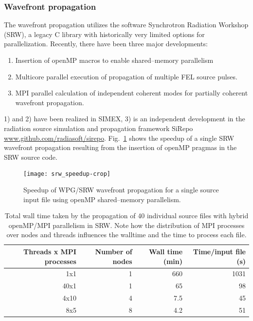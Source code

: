 \documentclass[10pt]{scrartcl}
\begin{document}
\subsubsection{Wavefront propagation}
The wavefront propagation utilizes the software Synchrotron Radiation Workshop
(SRW), a legacy C library with historically very limited options for
parallelization. Recently, there have been three major developments:
\begin{enumerate}
  \item Insertion of openMP macros to enable shared--memory parallelism
  \item Multicore parallel execution of propagation of multiple FEL source
    pulses.
  \item MPI parallel calculation of independent coherent modes for partially
    coherent wavefront propagation.
\end{enumerate}
%
1) and 2) have been realized in SIMEX, 3) is an independent development in the radiation source
simulation and propagation framework SiRepo
\url{www.github.com/radiasoft/sirepo}. Fig.~\ref{fig:srw_speedup} shows the
speedup of a single SRW wavefront propagation resulting from the insertion of
openMP pragmas in the SRW source code.
%
\begin{figure}[ht]
  \begin{center}
    \texttt{[image: srw\_speedup-crop]}
  \end{center}
  \caption{Speedup of WPG/SRW wavefront propagation for a single source input
  file using openMP shared--memory parallelism.}
  \label{fig:srw_speedup}
\end{figure}
%
\begin{table}
  \centering
  \begin{tabular}{rrrr}
    \textbf{Threads x MPI processes} & \textbf{Number of nodes} &
    \textbf{Wall time (min)} & \textbf{Time/input file (s)} \\
    \hline
    1x1        & 1     & 660       &  1031 \\
    40x1       & 1     &  65       &    98 \\
    4x10       & 4     &   7.5     &    45 \\
    8x5        & 8     &   4.2     &    51 \\
  \end{tabular}
  \caption{Total wall time  taken by the propagation of 40 individual source files with hybrid
  openMP/MPI parallelism in SRW. Note how the distribution of MPI processes over nodes
and threads influences the walltime and the time to process each file.}
  \label{tab:srw_hybrid_timings}
\end{table}
%
\end{document}
